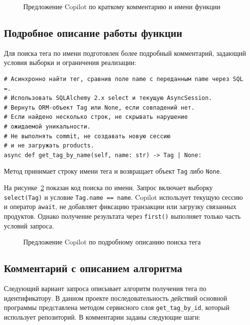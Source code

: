\begin{figure}[H]
	\centering
	\caption{Предложение Copilot по краткому комментарию и имени функции}
	\label{fig:copilot-short-request}
\end{figure}

\subsection{Подробное описание работы функции}

Для поиска тега по имени подготовлен более подробный комментарий,
задающий условия выборки и ограничения реализации:

\begingroup
\small
\renewcommand{\ttdefault}{\rmdefault}
\begin{verbatim}
# Асинхронно найти тег, сравнив поле name с переданным name через SQL =.
# Использовать SQLAlchemy 2.x select и текущую AsyncSession.
# Вернуть ORM-объект Tag или None, если совпадений нет.
# Если найдено несколько строк, не скрывать нарушение
# ожидаемой уникальности.
# Не выполнять commit, не создавать новую сессию
# и не загружать products.
async def get_tag_by_name(self, name: str) -> Tag | None:
\end{verbatim}
\endgroup

Метод принимает строку имени тега и возвращает объект \verb|Tag|
либо \verb|None|.

На рисунке~\ref{fig:copilot-detailed-request} показан код поиска по имени.
Запрос включает выборку \verb|select(Tag)| и условие \verb|Tag.name == name|.
Copilot использует текущую сессию и оператор \verb|await|, не добавляет
фиксацию транзакции или загрузку связанных продуктов. Однако получение
результата через \verb|first()| выполняет только часть условий запроса.

\begin{figure}[H]
	\centering
	\caption{Предложение Copilot по подробному описанию поиска тега}
	\label{fig:copilot-detailed-request}
\end{figure}

\subsection{Комментарий с описанием алгоритма}

Следующий вариант запроса описывает алгоритм получения тега
по идентификатору. В данном проекте последовательность действий основной
программы представлена методом сервисного слоя
\verb|get_tag_by_id|, который использует репозиторий. В комментарии
заданы следующие шаги:


